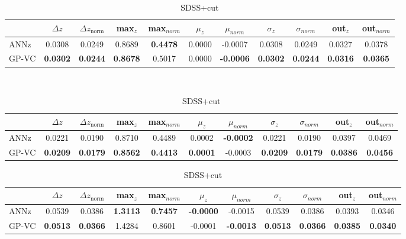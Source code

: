 \documentclass[useAMS,usenatbib,fleqn]{mn2e}
\begin{document}
\begin{center}
\begin{table}


\begin{subtable}{\textwidth}
\centering

\begin{tabular}{| l | c | c |  c | c |  c | c |  c | c |  c | c | }
     				&	$\Delta z$	&	$\Delta z_\textrm{norm}$	&	max$_{z}$ & max$_{norm}$		&	$\mu_{z}$&	$\mu_{norm}$	& $\sigma_{z}$ & $\sigma_{norm}$ & out$_{z}$&out$_{norm}$\\	\hline
	{\sc ANNz}		&	0.0308	&	0.0249		&	0.8689		&	\textbf{0.4478}&	0.0000		&	-0.0007 &	0.0308		&	0.0249&	0.0327		&	0.0378\\
	{\sc GP-VC } 	&	\textbf{0.0302} 	&	\textbf{0.0244}		&	\textbf{0.8678}	&	0.5017 & 0.0000		&	\textbf{-0.0006}&	\textbf{0.0302}		&	\textbf{0.0244}&	\textbf{0.0316} 	&	\textbf{0.0365}\\\hline
  \end{tabular}

\caption{SDSS}
\label{table-final-results-sdss}
\end{subtable}

\begin{subtable}{\textwidth}\
\centering
\begin{tabular}{| l | c | c |  c | c |  c | c |  c | c |  c | c | }
     				&	$\Delta z$	&	$\Delta z_\textrm{norm}$	&	max$_{z}$ & max$_{norm}$		&	$\mu_{z}$&	$\mu_{norm}$	& $\sigma_{z}$ & $\sigma_{norm}$ & out$_{z}$&out$_{norm}$\\	\hline
	{\sc ANNz}		&	0.0221	&	0.0190		&	0.8710		&	0.4489&	0.0002		&	\textbf{-0.0002}&	0.0221		&	0.0190&	0.0397		&	0.0469\\
	{\sc GP-VC } 	&	\textbf{0.0209} 	&	\textbf{0.0179}		&	\textbf{0.8562}	&	\textbf{0.4413} & \textbf{0.0001}		&	-0.0003&	\textbf{0.0209}		&	\textbf{0.0179}&	\textbf{0.0386} 	&	\textbf{0.0456}\\\hline
  \end{tabular}

\caption{SDSS+cut}
\label{table-final-results-sdss-cut}
\end{subtable}

\begin{subtable}{\textwidth}
\centering

\begin{tabular}{| l | c | c |  c | c |  c | c |  c | c |  c | c | }
     				&	$\Delta z$	&	$\Delta z_\textrm{norm}$	&	max$_{z}$ & max$_{norm}$		&	$\mu_{z}$&	$\mu_{norm}$	& $\sigma_{z}$ & $\sigma_{norm}$ & out$_{z}$&out$_{norm}$\\	\hline
	{\sc ANNz}		&	0.0539	&	0.0386		&	\textbf{1.3113}		&	\textbf{0.7457}&	\textbf{-0.0000}		&	-0.0015 &	0.0539		&	0.0386&	0.0393		&	0.0346\\
	{\sc GP-VC } 	&	\textbf{0.0513} 	&	\textbf{0.0366}		&	1.4284	&	0.8601 & -0.0001		&	\textbf{-0.0013}&	\textbf{0.0513}		&	\textbf{0.0366}&	\textbf{0.0385} 	&	\textbf{0.0340}\\\hline
  \end{tabular}


\end{subtable}
\end{table}
\end{center}
\end{document}
